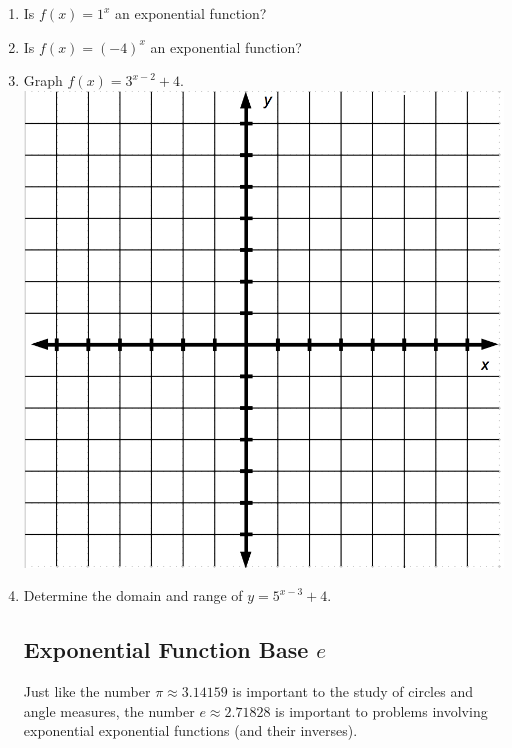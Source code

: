 


\begin{enumerate}

\item Is $f(x)=1^x$ an exponential function?\\[.5in]



\item Is $f(x)=(-4)^x$ an exponential function?\\


\newpage
\item Graph $f(x)=3^{x-2}+4.$\\
\includegraphics[scale=.5]{bigaxes}

\item Determine the domain and range of $y=5^{x-3}+4$.  \\[1in]





\subsection{Exponential Function Base $e$} 
Just like the number $\pi \approx 3.14159$ is important to the study
of circles and angle measures, the number $e \approx 2.71828$ is
important to problems involving exponential exponential functions (and
their inverses).


\end{enumerate}
